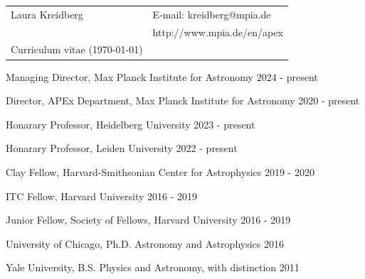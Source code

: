 \documentclass[12pt,letterpaper]{article}
\def\name{Laura R. Kreidberg}
\begin{document}
 \sloppy


\begin{tabular}{@{}p{4.0in}@{}p{5.0in}}
    \LARGE{Laura Kreidberg}                  & E-mail: kreidberg@mpia.de\\  
    \,                                       & http://www.mpia.de/en/apex \\ 
    \large{Curriculum vitae} (\today) & \, \\
\end{tabular}
\vspace{5mm}

\begin{list}{}{\cvlist}
    \item Managing Director, Max Planck Institute for Astronomy \hfill 2024 - present\\
    \item Director, APEx Department, Max Planck Institute for Astronomy \hfill 2020 - present\\
    \item Honarary Professor, Heidelberg University \hfill 2023 - present \\
    \item Honarary Professor, Leiden University \hfill 2022 - present \\
    \item Clay Fellow, Harvard-Smithsonian Center for Astrophysics \hfill 2019 - 2020\\
    \item ITC Fellow, Harvard University \hfill 2016 - 2019\\
    \item Junior Fellow, Society of Fellows, Harvard University \hfill 2016 - 2019\\
\end{list}


\begin{list}{}{\cvlist}
    \item University of Chicago, Ph.D. Astronomy and Astrophysics \hfill 2016
    \item Yale University, B.S. Physics and Astronomy, with distinction \hfill 2011
\end{list}


\end{document}
